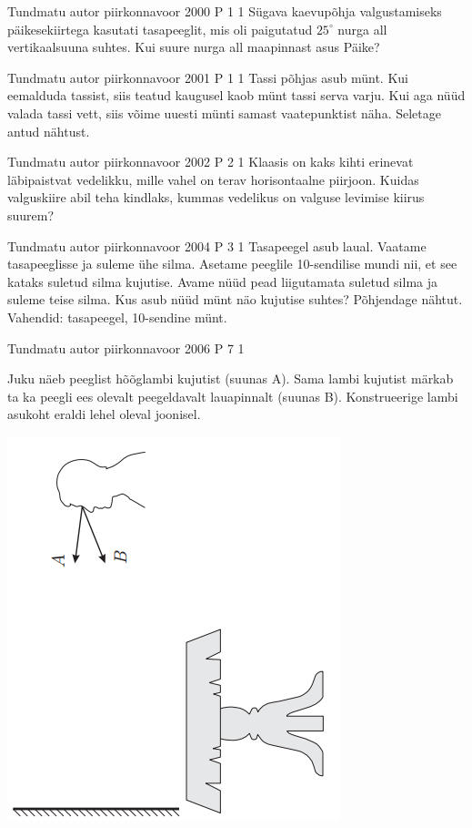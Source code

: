 \documentclass[11pt]{article}
\begin{document}
{%
{Tundmatu autor} %
{piirkonnavoor} %
{2000} %
{P 1} %
{1} %
{
\ifStatement
Sügava kaevupõhja valgustamiseks päikesekiirtega kasutati tasapeeglit, mis oli paigutatud $25^{\circ}$ nurga all vertikaalsuuna suhtes. Kui suure nurga all maapinnast asus Päike?
\fi
}

{Tundmatu autor} %
{piirkonnavoor} %
{2001} %
{P 1} %
{1} %
{
\ifStatement
Tassi põhjas asub münt. Kui eemalduda tassist, siis teatud kaugusel kaob münt tassi serva varju. Kui aga nüüd valada tassi vett, siis võime uuesti münti samast vaatepunktist näha. Seletage antud nähtust.
\fi
}

{Tundmatu autor} %
{piirkonnavoor} %
{2002} %
{P 2} %
{1} %
{
\ifStatement
Klaasis on kaks kihti erinevat läbipaistvat vedelikku, mille vahel on terav horisontaalne piirjoon. Kuidas valguskiire abil teha kindlaks, kummas vedelikus on valguse levimise kiirus suurem?
\fi
}
 
 



{Tundmatu autor} %
{piirkonnavoor} %
{2004} %
{P 3} %
{1} %
{
\ifStatement
Tasapeegel asub laual. Vaatame tasapeeglisse ja suleme ühe silma. Asetame peeglile 10-sendilise mundi nii, et see kataks suletud silma kujutise. Avame nüüd pead liigutamata suletud silma ja suleme teise silma. Kus asub nüüd münt näo kujutise suhtes? Põhjendage nähtut. Vahendid: tasapeegel, 10-sendine münt.
\fi
}

{Tundmatu autor} %
{piirkonnavoor} %
{2006} %
{P 7} %
{1} %
{
\ifStatement
Juku näeb peeglist hõõglambi kujutist (suunas A). Sama lambi kujutist märkab ta ka peegli ees olevalt peegeldavalt lauapinnalt (suunas B). Konstrueerige lambi asukoht eraldi lehel oleval joonisel.
\begin{center}
	\includegraphics[width=0.5\linewidth]{2006-v2p-07-yl.PNG}
\end{center}
\fi
}


}
\end{document}
